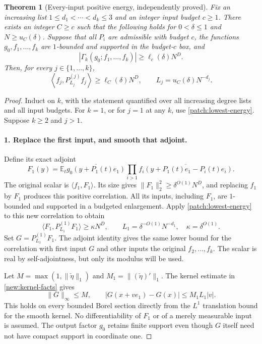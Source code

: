 \documentclass[11pt]{article}
\newtheorem{theorem}{Theorem}[section]
\theoremstyle{definition}
\begin{document}
\begin{theorem}[Every-input positive energy, independently proved]
\label{patch:energy-core}
Fix an increasing list $1\leq d_1<\cdots<d_k\leq3$ and an integer input budget $c\geq1$.
There exists an integer $C\geq c$ such that the following holds for $0<\delta\leq1$ and
$N\geq u_C(\delta)$.  Suppose that all $P_i$ are admissible with budget $c$, the functions
$g_0,f_1,\ldots,f_k$ are $1$-bounded and supported in the budget-$c$ box, and
\[
 |\Gamma_k(g_0;f_1,\ldots,f_k)|\geq\ell_c(\delta)N^D.
\]
Then, for every $j\in\{1,\ldots,k\}$,
\[
 \label{patch:all-energy}
 \left\langle f_j,P_{L_j}^{(j)}f_j\right\rangle
      \geq\ell_C(\delta)N^D,
       \qquad L_j=u_C(\delta)N^{-d_j}.
 \tag{\theequation}
\]
\end{theorem}
\begin{proof}
Induct on $k$, with the statement quantified over all increasing degree lists and all input
budgets.  For $k=1$, or for $j=1$ at any $k$, use \cref{patch:lowest-energy}.
Suppose $k\geq2$ and $j>1$.

\paragraph{1. Replace the first input, and smooth that adjoint.}
Define its exact adjoint
\[
 F_1(y)=\mathbb E_t\overline{g_0(y+P_1(t)e_1)}
                  \prod_{i>1}\overline{f_i(y+P_1(t)e_1-P_i(t)e_i)}.
\]
The original scalar is $\langle f_1,F_1\rangle$.  Its size gives
$\|F_1\|_2^2\geq\delta^{O(1)}N^D$, and replacing $f_1$ by $F_1$ produces this positive
correlation.  All its inputs, including $F_1$, are $1$-bounded and supported in a budgeted
enlargement.  Apply \cref{patch:lowest-energy} to this new correlation to obtain
\[
 \langle F_1,P_{L_1}^{(1)}F_1\rangle\geq\kappa N^D,
 \qquad L_1=\delta^{-O(1)}N^{-d_1},\quad\kappa=\delta^{O(1)}.
\]
Set $G=P_{L_1}^{(1)}F_1$.  The adjoint identity gives the same lower bound for the
correlation with first input $G$ and other inputs the original $f_2,\ldots,f_k$.
The scalar is real by self-adjointness, but only its modulus will be used.

Let $M=\max(1,\|\check\eta\|_1)$ and $M_1=\| (\check\eta)'\|_1$.
The kernel estimate in \cref{new:kernel-facts} gives
\[
 \|G\|_\infty\leq M,\qquad
 |G(x+ve_1)-G(x)|\leq M_1L_1|v|.
\]
This holds on every bounded Borel section directly from the $L^1$ translation bound for the
smooth kernel. No differentiability of $F_1$ or of a merely measurable input is assumed.
The output factor $g_0$ retains finite support even though $G$ itself need not have compact
support in coordinate one.


\end{proof}
\end{document}
